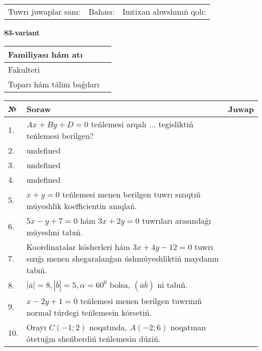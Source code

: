 \documentclass{article}
\begin{document}
\vspace{0.7cm}

\begin{tabular}{lll}
Tuwrı juwaplar sanı: \underline{\hspace{1cm}} & 
Bahası: \underline{\hspace{1cm}} & 
Imtixan alıwshınıń qolı: \underline{\hspace{2cm}} \\
\end{tabular}

\egroup

\newpage


\textbf{83-variant}\\

\bgroup
\def\arraystretch{1.6} %

\begin{tabular}{|m{5.7cm}|m{9.5cm}|}
\hline
Familiyası hám atı & \\
\hline
Fakulteti  & \\
\hline
Toparı hám tálim baǵdarı  & \\
\hline
\end{tabular}

\vspace{0.7cm}

\begin{tabular}{|m{0.7cm}|m{10cm}|m{4cm}|}
\hline
№ & Soraw & Juwap \\
\hline
1. & \(Ax + By + D = 0\) teńlemesi arqalı ... tegisliktiń teńlemesi berilgen? &  \\
\hline
2. & undefined &  \\
\hline
3. & undefined &  \\
\hline
4. & undefined &  \\
\hline
5. & \(x + y = 0\) teńlemesi menen berilgen tuwrı sızıqtıń múyeshlik koefficientin anıqlań. &  \\
\hline
6. & \(5 x - y + 7 = 0\) hám \(3 x + 2 y = 0\) tuwrıları arasındaǵı múyeshni tabıń. &  \\
\hline
7. & Koordinatalar kósherleri hám \( 3 x + 4 y - 12 = 0 \) tuwrı sızıǵı menen shegaralanǵan úshmúyeshliktiń maydanın tabıń. &  \\
\hline
8. & \(\left| \bar{a} \right| = 8, \left| \bar{b} \right| = 5, \alpha = 60^{0}\) bolsa, \(( \bar{a}\bar{b} )\) ni tabıń. &  \\
\hline
9. & \(x - 2 y + 1 = 0\) teńlemesi menen berilgen tuwrınıń normal túrdegi teńlemesin kórsetiń. &  \\
\hline
10. & Orayı \(C (- 1;2)\) noqatında, \(A (- 2;6 )\) noqatınan ótetuǵın sheńberdiń teńlemesin dúziń. & \\
\hline
\end{tabular}
\end{document}
